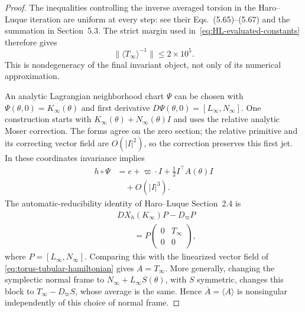 \begin{proof}
The inequalities controlling the inverse averaged torsion in the
Haro--Luque iteration are uniform at every step: see their
Eqs.~(5.65)--(5.67) and the summation in Section~5.3.
The strict margin used in~\eqref{eq:HL-evaluated-constants} therefore gives
\[
 \|\langle T_\infty\rangle^{-1}\|\leq2\times10^5.
\]
This is nondegeneracy of the final invariant object, not only of its
numerical approximation.

An analytic Lagrangian neighborhood chart $\Psi$ can be chosen with
$\Psi(\theta,0)=K_\infty(\theta)$ and first derivative
$D\Psi(\theta,0)=[L_\infty,N_\infty]$.
One construction starts with $K_\infty(\theta)+N_\infty(\theta)I$ and
uses the relative analytic Moser correction. The forms agree on the
zero section; the relative primitive and its correcting vector field
are $O(|I|^2)$, so the correction preserves this first jet.
In these coordinates invariance implies
\begin{equation}
 \begin{aligned}
 h\circ\Psi&=e+\varpi\cdot I+\tfrac12 I^\top A(\theta)I\\
 &\quad+O(|I|^3).
 \end{aligned}
 \label{eq:torus-tubular-hamiltonian}
\end{equation}
The automatic-reducibility identity of Haro--Luque Section~2.4 is
\[
 \begin{aligned}
 &DX_h(K_\infty)P-D_\varpi P\\
 &\qquad=P\begin{pmatrix}0&T_\infty\\0&0\end{pmatrix},
 \end{aligned}
\]
where $P=[L_\infty,N_\infty]$.
Comparing this with the linearized vector field of
\eqref{eq:torus-tubular-hamiltonian} gives $A=T_\infty$.
More generally, changing the symplectic normal frame to
$N_\infty+L_\infty S(\theta)$, with $S$ symmetric, changes this block
to $T_\infty-D_\varpi S$, whose average is the same.
Hence $\overline A=\langle A\rangle$ is nonsingular independently of
this choice of normal frame.


\end{proof}
